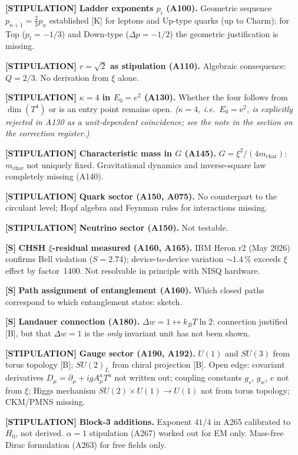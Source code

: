 \textbf{[STIPULATION]} \textbf{Ladder exponents $p_i$ (A100).}
Geometric sequence $p_{n+1}=\tfrac23p_n$ established [K] for leptons and Up-type
quarks (up to Charm); for Top ($p_t=-1/3$) and Down-type ($\Delta p=-1/2$) the
geometric justification is missing.

\textbf{[STIPULATION]} \textbf{$r=\sqrt2$ as stipulation (A110).}
Algebraic consequence: $Q=2/3$. No derivation from $\xi$ alone.

\textbf{[STIPULATION]} \textbf{$\kappa=4$ in $E_0=e^2$ (A130).}
Whether the four follows from $\dim(T^4)$ or is an entry point remains open. \textit{($\kappa=4$, i.e.\ $E_0=\mathrm{e}^2$, is explicitly rejected in A130 as a unit-dependent coincidence; see the note in the section on the correction register.)}

\textbf{[STIPULATION]} \textbf{Characteristic mass in $G$ (A145).}
$G=\xi^2/(4m_\text{char})$: $m_\text{char}$ not uniquely fixed. Gravitational
dynamics and inverse-square law completely missing (A140).

\textbf{[STIPULATION]} \textbf{Quark sector (A150, A075).}
No counterpart to the circulant level; Hopf algebra and Feynman rules for
interactions missing.

\textbf{[STIPULATION]} \textbf{Neutrino sector (A150).} Not testable.

\textbf{[S]} \textbf{CHSH $\xi$-residual measured (A160, A165).}
IBM Heron r2 (May 2026) confirms Bell violation ($S=2{.}74$); device-to-device
variation $\sim1{.}4\,\%$ exceeds $\xi$ effect by factor~1400. Not resolvable
in principle with NISQ hardware.

\textbf{[S]} \textbf{Path assignment of entanglement (A160).}
Which closed paths correspond to which entanglement states: sketch.

\textbf{[S]} \textbf{Landauer connection (A180).}
$\Delta w=1\leftrightarrow k_BT\ln2$: connection justified [B], but that
$\Delta w=1$ is the \emph{only} invariant unit has not been shown.

\textbf{[STIPULATION]} \textbf{Gauge sector (A190, A192).}
$U(1)$ and $SU(3)$ from torus topology [B]; $SU(2)_L$ from chiral projection [B].
Open edge: covariant derivatives $D_\mu=\partial_\mu+igA_\mu^aT^a$ not written
out; coupling constants $g_s$, $g_w$, $e$ not from $\xi$; Higgs mechanism
$SU(2)\times U(1)\to U(1)$ not from torus topology; CKM/PMNS missing.

\textbf{[STIPULATION]} \textbf{Block-3 additions.} Exponent $41/4$ in A265
calibrated to $H_0$, not derived. $\alpha=1$ stipulation (A267) worked out for
EM only. Mass-free Dirac formulation (A263) for free fields only.

